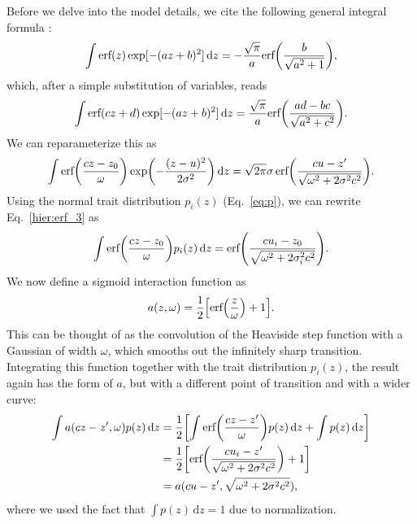\documentclass[10pt]{article}
\let\originalleft\left
\let\originalright\right
\renewcommand{\left}{\mathopen{}\mathclose\bgroup\originalleft}
\renewcommand{\right}{\aftergroup\egroup\originalright}
\begin{document}
Before we delve into the model details, we cite the following general integral formula \citep[integral 4.3.13]{ng_geller_integrals_1968}:
\begin{equation}
  \label{hier:erf}
  \int \text{erf}(z) \exp[-(az+b)^2] \,\text{d} z = -\frac{\sqrt{\pi}}{a} \text{erf} \left( \frac{b}{\sqrt{a^2 + 1}} \right) ,
\end{equation}
which, after a simple substitution of variables, reads
\begin{equation}
\label{hier:erf_2}
\int \text{erf}(cz+d) \exp[-(az+b)^2] \,\text{d} z
= \frac{\sqrt{\pi}}{a} \text{erf} \left( \frac{ad - bc}{\sqrt{a^2 + c^2}} \right) .
\end{equation} 
We can reparameterize this as 
\begin{equation}
\label{hier:erf_3}
\int \text{erf}\left(\frac{cz-z_0}{\omega}\right)
\exp \left(-\frac{(z-u)^2}{2\sigma^2} \right) \,\text{d} z
= \sqrt{2\pi}\sigma \, \text{erf}\left( \frac{cu-z'}{\sqrt{\omega^2+2\sigma^2c^2}}\right) .
\end{equation}
Using the normal trait distribution $p_i(z)$ (Eq.~\ref{eq:p}), we can rewrite Eq.~\ref{hier:erf_3} as 
\begin{equation}
\int \text{erf}\left(\frac{cz-z_0}{\omega}\right) p_i(z) \,\text{d} z
= \text{erf}\left( \frac{cu_i-z_0}{\sqrt{\omega^2+2\sigma_i^2c^2}}\right) .
\end{equation}
We now define a sigmoid interaction function as
\begin{equation}
  \label{sigmoid}
  a(z,\omega) = \frac{1}{2} \left[ \text{erf} \left( \frac{z}{\omega} \right) + 1 \right] .
\end{equation}  
This can be thought of as the convolution of the Heaviside
step function with a Gaussian of width $\omega$, which smooths out the
infinitely sharp transition. Integrating this function together with the trait distribution $p_i(z)$, the result again has the form of $a$, but with a different point of transition and with a wider curve:
\begin{equation}
\begin{aligned}
  \label{hier:alpha_minor}
  \int a(cz-z', \omega) p(z) \,\text{d} z &= \frac{1}{2}\left[ \int \text{erf}\left(\frac{cz-z'}{\omega}\right) p(z) \,\text{d} z + \int p(z) \,\text{d}z \right] \\ &= \frac{1}{2} \left[ \text{erf}\left( \frac{cu_i-z'}{\sqrt{\omega^2+2\sigma^2c^2}} \right) + 1 \right] \\ &= a(cu-z',\sqrt{\omega^2+2\sigma^2c^2}) ,
\end{aligned}
\end{equation}
where we used the fact that $\int p(z) \,\text{d} z = 1$
due to normalization.
\end{document}
